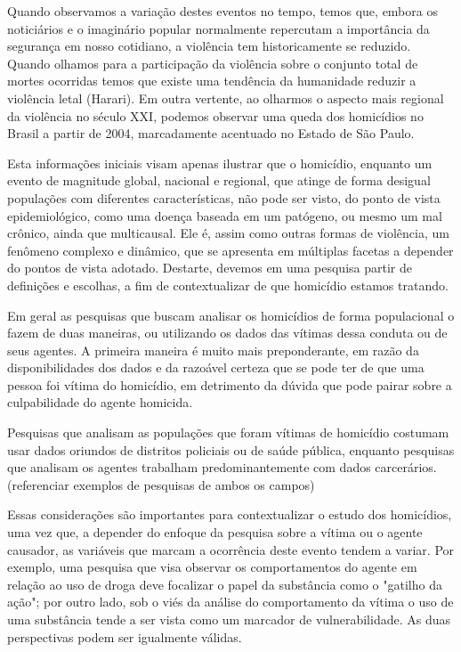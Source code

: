 Quando observamos a variação destes eventos no tempo, temos que, embora os noticiários e o imaginário popular normalmente repercutam a importância da segurança em nosso cotidiano, a violência tem historicamente se reduzido. Quando olhamos para a participação da violência sobre o conjunto total de mortes ocorridas temos que existe uma tendência da humanidade reduzir a violência letal (Harari). Em outra vertente, ao olharmos o aspecto mais regional da violência no século XXI, podemos observar uma queda dos homicídios no Brasil a partir de 2004, marcadamente acentuado no Estado de São Paulo.

Esta informações iniciais visam apenas ilustrar que o homicídio, enquanto um evento de magnitude global, nacional e regional, que atinge de forma desigual populações com diferentes características, não pode ser visto, do ponto de vista epidemiológico, como uma doença baseada em um patógeno, ou mesmo um mal crônico, ainda que multicausal. Ele é, assim como outras formas de violência, um fenômeno complexo e dinâmico, que se apresenta em múltiplas facetas a depender do pontos de vista adotado. Destarte, devemos em uma pesquisa partir de definições e escolhas, a fim de contextualizar de que homicídio estamos tratando. 


Em geral as pesquisas que buscam analisar os homicídios de forma populacional o fazem de duas maneiras, ou utilizando os dados das vítimas dessa conduta ou de seus agentes. A primeira maneira é muito mais preponderante, em razão da disponibilidades dos dados e da razoável certeza que se pode ter de que uma pessoa foi vítima do homicídio, em detrimento da dúvida que pode pairar sobre a culpabilidade do agente homicida.

Pesquisas que analisam as populações que foram vítimas de homicídio costumam usar dados oriundos de distritos policiais ou de saúde pública, enquanto pesquisas que analisam os agentes trabalham predominantemente com dados carcerários. (referenciar exemplos de pesquisas de ambos os campos)

Essas considerações são importantes para contextualizar o estudo dos homicídios, uma vez que, a depender do enfoque da pesquisa sobre a vítima ou o agente causador, as variáveis que marcam a ocorrência deste evento tendem a variar. Por exemplo, uma pesquisa que visa observar os comportamentos do agente em relação ao uso de droga deve focalizar o papel da substância como o "gatilho da ação"; por outro lado, sob o viés da análise do comportamento da vítima o uso de uma substância tende a ser vista como um marcador de vulnerabilidade. As duas perspectivas podem ser igualmente válidas.

